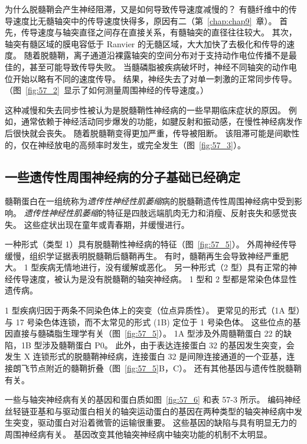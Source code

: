 为什么脱髓鞘会产生神经阻滞，又是如何导致传导速度减慢的？
有髓纤维中的传导速度比无髓轴突中的传导速度快得多，原因有二（第~\ref{chap:chap9}~章）。
首先，传导速度与轴突直径之间存在直接关系，有髓轴突的直径往往较大。
其次，轴突有髓区域的膜电容低于 Ranvier 的无髓区域，大大加快了去极化和传导的速度。
随着脱髓鞘，离子通道沿裸露轴突的空间分布对于支持动作电位传播不是最佳的，甚至可能导致传导失败。
当髓磷脂被疾病破坏时，神经不同轴突的动作电位开始以略有不同的速度传导。
结果，神经失去了对单一刺激的正常同步传导。
（图~\ref{fig:57_2}~显示了如何测量周围神经的传导速度。）


这种减慢和失去同步性被认为是脱髓鞘性神经病的一些早期临床症状的原因。
例如，通常依赖于神经活动同步爆发的功能，如腱反射和振动感，在慢性神经病发作后很快就会丧失。
随着脱髓鞘变得更加严重，传导被阻断。
该阻滞可能是间歇性的，仅在神经放电的高频率时发生，或完全发生（图~\ref{fig:57_3}）。



\subsection{一些遗传性周围神经病的分子基础已经确定}

髓鞘蛋白在一组统称为\textit{遗传性神经性肌萎缩}病的脱髓鞘遗传性周围神经病中受到影响。
\textit{遗传性神经性肌萎缩}的特征是四肢远端肌肉无力和消瘦、反射丧失和感觉丧失。
这些症状出现在童年或青春期，并缓慢进行。


一种形式（类型 1）具有脱髓鞘性神经病的特征（图~\ref{fig:57_5}）。
外周神经传导缓慢，组织学证据表明脱髓鞘后髓鞘再生。
有时，髓鞘再生会导致神经严重肥大。
1 型疾病无情地进行，没有缓解或恶化。
另一种形式（2 型）具有正常的神经传导速度，被认为是没有脱髓鞘的轴突神经病。
1 型和 2 型都是常染色体显性遗传病。


1 型疾病归因于两条不同染色体上的突变（位点异质性）。
更常见的形式（1A 型）与 17 号染色体连锁，而不太常见的形式 (1B) 定位于 1 号染色体。
这些位点的基因直接与髓磷脂生理学有关（图~\ref{fig:57_5}）。
1A 型涉及外周髓鞘蛋白 22 的缺陷，1B 型涉及髓鞘蛋白 P0。
此外，由于表达连接蛋白 32 的基因发生突变，会发生 X 连锁形式的脱髓鞘神经病，连接蛋白 32 是间隙连接通道的一个亚基，连接朗飞节点附近的髓鞘折叠（图~\ref{fig:57_5}B，C）。
还有其他基因与遗传性脱髓鞘有关。


一些与轴突神经病有关的基因和蛋白质如图~\ref{fig:57_6} 和表 57-3 所示。
编码神经丝轻链亚基和与驱动蛋白相关的轴突运动蛋白的基因在两种类型的轴突神经病中发生突变，驱动蛋白对沿着微管的运输很重要。
这些基因的缺陷与具有明显无力的周围神经病有关。
基因改变其他轴突神经病中轴突功能的机制不太明显。


